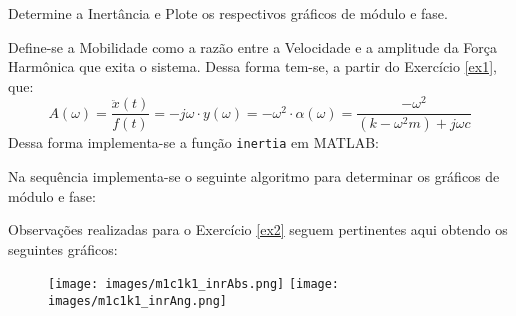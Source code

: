 \documentclass{article}
\begin{document}
\newpage
\begin{exercise}\label{ex4}
    Determine a Inertância e Plote os respectivos gráficos de módulo e fase.
\end{exercise}
\begin{resolution}
    Define-se a Mobilidade como a razão entre a Velocidade e a amplitude da Força Harmônica que exita o sistema. Dessa forma tem-se, a partir do Exercício \ref{ex1}, que:
    \begin{equation}
        \boxed{
            A (\omega) = 
            \frac{\ddot{x}(t)}{f(t)} = 
            -j\omega   \cdot     y (\omega) = 
            - \omega^2 \cdot \alpha(\omega) = 
            \frac{-\omega^2}{(k -\omega^2 m) + j \omega c}
        }
    \end{equation}
    Dessa forma implementa-se a função \texttt{inertia} em MATLAB:
    \begin{scriptsize}
        \myMatlab
    \end{scriptsize}
    Na sequência implementa-se o seguinte algoritmo para determinar os gráficos de módulo e fase:
    \begin{scriptsize}
        \myMatlab
    \end{scriptsize}
    Observações realizadas para o Exercício \ref{ex2} seguem pertinentes aqui obtendo os seguintes gráficos:
    \begin{figure}[H]
        \centering
        \texttt{[image: images/m1c1k1\_inrAbs.png]}
        \texttt{[image: images/m1c1k1\_inrAng.png]}
    \end{figure}
\end{resolution}
\end{document}
